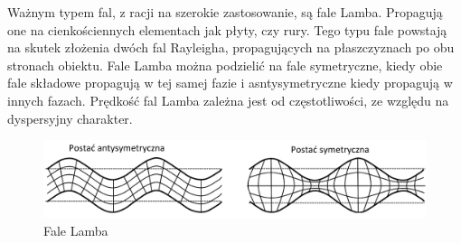 Ważnym typem fal, z racji na szerokie zastosowanie, są fale Lamba. Propagują one na cienkościennych elementach jak płyty, czy rury. Tego typu fale powstają na skutek złożenia dwóch fal Rayleigha, propagujących na płaszczyznach po obu stronach obiektu. Fale Lamba można podzielić na fale symetryczne, kiedy obie fale składowe propagują w tej samej fazie i asntysymetryczne kiedy propagują w innych fazach. Prędkość fal Lamba zależna jest od częstotliwości, ze względu na dyspersyjny charakter.

\begin{figure}[h]
\centering
\includegraphics[width=14cm]{Zdjecia/2/fala_lamba}
\caption{Fale Lamba}
\label{fig:fala_lamba}
\end{figure}






















